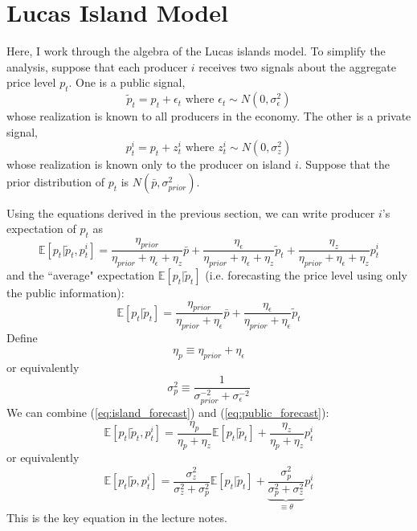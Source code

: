 \documentclass[12pt]{article}
\begin{document}
\section{Lucas Island Model}
Here, I work through the algebra of the Lucas islands model. To simplify the analysis, suppose that each producer $i$ receives two signals about the aggregate price level $p_t$. One is a public signal,
\[\tilde{p}_t = p_t + \epsilon_t \text{ where $\epsilon_t \sim N(0, \sigma^2_\epsilon)$}\]
whose realization is known to all producers in the economy. The other is a private signal,
\[p_t^i = p_t + z_t^i \text{ where $z_t^i \sim N(0, \sigma^2_z)$}\]
whose realization is known only to the producer on island $i$. Suppose that the prior distribution of $p_t$ is $N(\bar{p}, \sigma^2_{prior})$. 

Using the equations derived in the previous section, we can write producer $i$'s expectation of $p_t$ as
\begin{equation} \label{eq:island_forecast}
	\mathbb{E}[p_t|\tilde{p}_t, p_t^i] = \frac{\eta_{prior}}{\eta_{prior} + \eta_\epsilon + \eta_{z}} \bar{p} + \frac{\eta_\epsilon}{\eta_{prior} + \eta_\epsilon + \eta_{z}} \tilde{p}_t + \frac{\eta_z}{\eta_{prior} + \eta_\epsilon + \eta_{z}} p_t^i
\end{equation}
and the ``average" expectation $\mathbb{E}[p_t|\tilde{p}_t]$ (i.e. forecasting the price level using only the public information):
\begin{equation} \label{eq:public_forecast}
	\mathbb{E}[p_t|\tilde{p}_t] = \frac{\eta_{prior}}{\eta_{prior} + \eta_\epsilon} \bar{p} + \frac{\eta_\epsilon}{\eta_{prior} + \eta_\epsilon} \tilde{p}_t
\end{equation}
Define 
\[\eta_p \equiv \eta_{prior} + \eta_\epsilon\]
or equivalently
\[\sigma^2_p \equiv \frac{1}{\sigma^{-2}_{prior} + \sigma^{-2}_\epsilon}\]
We can combine (\ref{eq:island_forecast}) and (\ref{eq:public_forecast}):
\begin{equation}
	\mathbb{E}[p_t|\tilde{p}_t, p_t^i] = \frac{\eta_p}{\eta_p + \eta_z} \mathbb{E}[p_t|\tilde{p}_t] + \frac{\eta_z}{\eta_p + \eta_z} p_t^i
\end{equation}
or equivalently
\begin{equation}
	\mathbb{E}[p_t|\tilde{p}, p_t^i] = \frac{\sigma^2_z}{\sigma^2_z + \sigma^2_p} \mathbb{E}[p_t|\tilde{p}_t] + \underbrace{\frac{\sigma^2_p}{\sigma^2_p + \sigma^2_z}}_{\equiv \theta} p_t^i
\end{equation}
This is the key equation in the lecture notes. 
\end{document}
